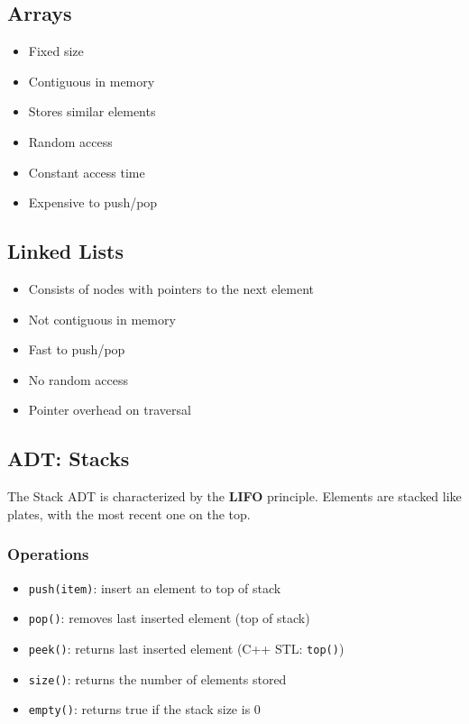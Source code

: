 \documentclass[12pt, letterpaper]{article}
\begin{document}
\subsection*{Arrays}

\begin{itemize}
    \item Fixed size
    \item Contiguous in memory
    \item Stores similar elements
    \item Random access
    \item Constant access time
    \item Expensive to push/pop
\end{itemize}

\subsection*{Linked Lists}

\begin{itemize}
    \item Consists of nodes with pointers to the next element
    \item Not contiguous in memory
    \item Fast to push/pop
    \item No random access
    \item Pointer overhead on traversal
\end{itemize}

\subsection*{ADT: Stacks}

The Stack ADT is characterized by the \textbf{LIFO} principle. Elements are stacked like plates, with the most recent one on the top.

\subsubsection*{Operations}

\begin{itemize}
    \item \texttt{push(item)}: insert an element to top of stack
    \item \texttt{pop()}: removes last inserted element (top of stack)
    \item \texttt{peek()}: returns last inserted element (C++ STL: \texttt{top()})
    \item \texttt{size()}: returns the number of elements stored
    \item \texttt{empty()}: returns true if the stack size is 0
\end{itemize}
\end{document}
